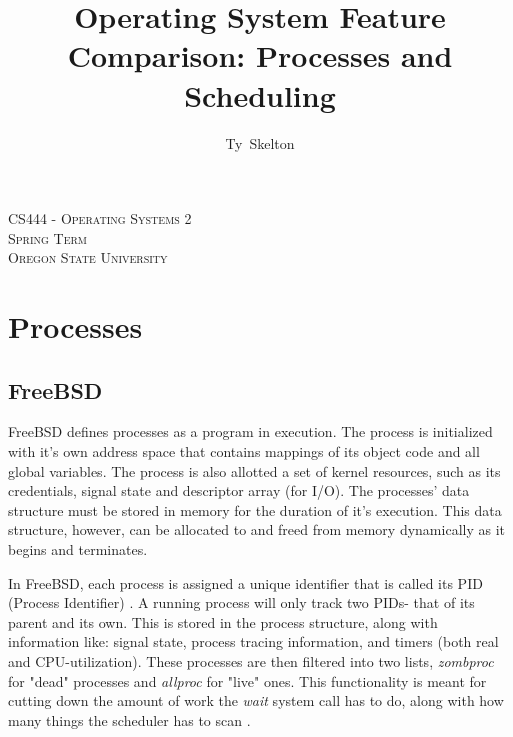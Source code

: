 \documentclass[10pt,draftclsnofoot,onecolumn]{IEEEtran}
\begin{document}
\singlespacing
\title{Operating System Feature Comparison: Processes and Scheduling}

\author{Ty~Skelton}

\maketitle

\begin{center}
\scshape %
CS444 - Operating Systems 2 \\  %
Spring Term\\[\baselineskip]    %
Oregon State University\par     %
\end{center}

\IEEEpeerreviewmaketitle

\newpage
{}
\tableofcontents
\newpage

\section{Processes}
\label{sec:Processes}

\subsection{FreeBSD}
\label{sub:Process FreeBSD}

\par FreeBSD defines processes as a program in execution.
The process is initialized with it's own address space that contains mappings of its object code and all global variables.
The process is also allotted a set of kernel resources, such as its credentials, signal state and descriptor array (for I/O). \cite{bsd:1}
The processes' data structure must be stored in memory for the duration of it's execution.
This data structure, however, can be allocated to and freed from memory dynamically as it begins and terminates.

\par In FreeBSD, each process is assigned a unique identifier that is called its PID (Process Identifier) \cite{bsd:1}.
A running process will only track two PIDs- that of its parent and its own.
This is stored in the process structure, along with information like: signal state, process tracing information, and timers (both real and CPU-utilization).
These processes are then filtered into two lists, \textit{zombproc} for "dead" processes and \textit{allproc} for "live" ones.
This functionality is meant for cutting down the amount of work the \textit{wait} system call has to do, along with how many things the scheduler has to scan \cite{bsd:1}.
\end{document}
